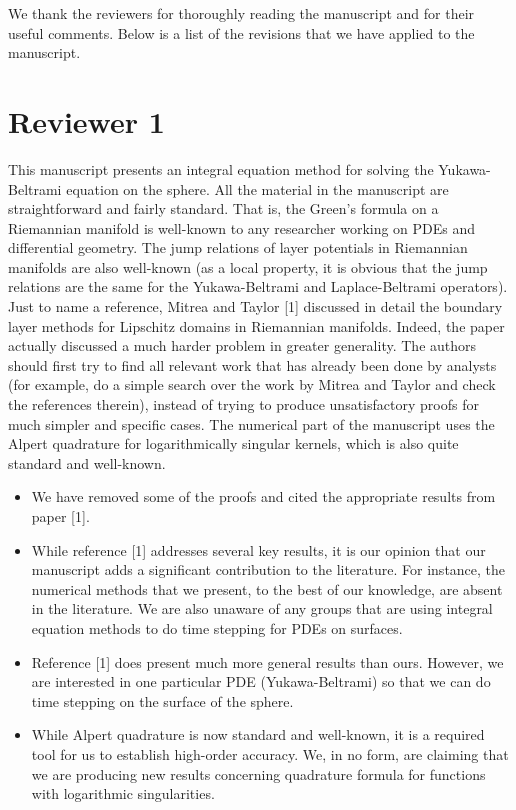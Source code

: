 \documentclass[11pt]{article}
\newcommand{\comment}[1]{{\color{blue} #1}}
\begin{document}
We thank the reviewers for thoroughly reading the manuscript and for
their useful comments.  Below is a list of the revisions that we have
applied to the manuscript.


\section*{Reviewer 1}

\comment{This manuscript presents an integral equation method for
solving the Yukawa-Beltrami equation on the sphere. All the material in
the manuscript are straightforward and fairly standard. That is, the
Green’s formula on a Riemannian manifold is well-known to any
researcher working on PDEs and differential geometry. The jump
relations of layer potentials in Riemannian manifolds are also
well-known (as a local property, it is obvious that the jump relations
are the same for the Yukawa-Beltrami and Laplace-Beltrami operators).
Just to name a reference, Mitrea and Taylor [1] discussed in detail the
boundary layer methods for Lipschitz domains in Riemannian manifolds.
Indeed, the paper actually discussed a much harder problem in greater
generality. The authors should first try to find all relevant work that
has already been done by analysts (for example, do a simple search over
the work by Mitrea and Taylor and check the references therein),
instead of trying to produce unsatisfactory proofs for much simpler and
specific cases. The numerical part of the manuscript uses the Alpert
quadrature for logarithmically singular kernels, which is also quite
standard and well-known.}
\begin{itemize}
  \item We have removed some of the proofs and cited the
  appropriate results from paper [1].
  \item While reference [1] addresses several key results, it is our
  opinion that our manuscript adds a significant contribution to the
  literature.  For instance, the numerical methods that we present, to
  the best of our knowledge, are absent in the literature.  We are also
  unaware of any groups that are using integral equation methods to do
  time stepping for PDEs on surfaces.
  \item Reference [1] does present much more general results than ours.
  However, we are interested in one particular PDE (Yukawa-Beltrami) so
  that we can do time stepping on the surface of the sphere.
  \item While Alpert quadrature is now standard and well-known, it is a
  required tool for us to establish high-order accuracy.  We, in no
  form, are claiming that we are producing new results concerning
  quadrature formula for functions with logarithmic singularities.
 \end{itemize}
\end{document}
